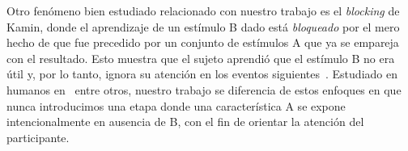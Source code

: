 Otro fenómeno bien estudiado relacionado con nuestro trabajo es el {\em blocking} de Kamin, donde el aprendizaje de un estímulo B dado está {\em bloqueado} por el mero hecho de que fue precedido por un conjunto de estímulos A que ya se empareja con el resultado. Esto muestra que el sujeto aprendió que el estímulo B no era útil y, por lo tanto, ignora su atención en los eventos siguientes~\cite{wagner1970stimulus, mackintosh1975theory, rescorlaw72}. Estudiado en humanos en~\cite{chapman1990cue, arcediano1997blocking, kruschke2000blocking} entre otros, nuestro trabajo se diferencia de estos enfoques en que nunca introducimos una etapa donde una característica A se expone intencionalmente en ausencia de B, con el fin de orientar la atención del participante.


